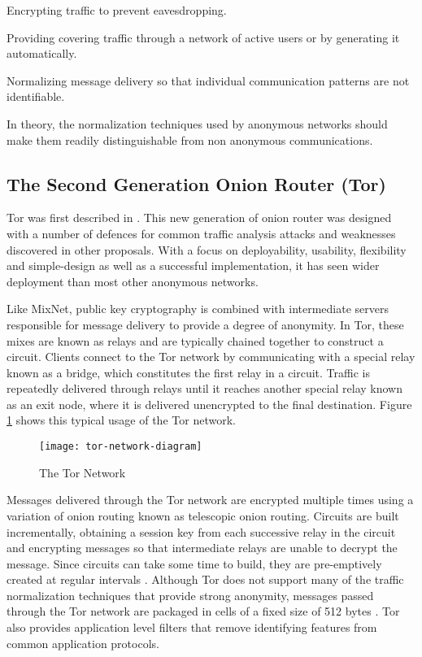 \documentclass{ecuthesis}
\begin{document}
\begin{itemize*}
  \item Encrypting traffic to prevent eavesdropping.
  \item Providing covering traffic through a network of active users or by
    generating it automatically.
  \item Normalizing message delivery so that individual communication patterns
    are not identifiable.
\end{itemize*}

In theory, the normalization techniques used by anonymous networks should make
them readily distinguishable from non anonymous communications.

\subsection{The Second Generation Onion Router (Tor)}

Tor was first described in 
\parencite{Dingledine:2004p314}. This new generation of onion router was
designed with a number of defences for common traffic analysis attacks and
weaknesses discovered in other proposals. With a focus on deployability,
usability, flexibility and simple-design \parencite[3-4]{Dingledine:2004p314}
as well as a successful implementation, it has seen wider deployment than most
other anonymous networks.

Like MixNet, public key cryptography is combined with intermediate servers
responsible for message delivery to provide a degree of anonymity. In Tor,
these mixes are known as relays and are typically chained together to
construct a circuit. Clients connect to the Tor network by communicating
with a special relay known as a bridge, which constitutes the first
relay in a circuit. Traffic is repeatedly delivered through relays until it
reaches another special relay known as an exit node, where it is
delivered unencrypted to the final destination. Figure \ref{tor-network} shows
this typical usage of the Tor network.

\begin{figure}[H]
  \centering\texttt{[image: tor-network-diagram]}
  \caption{The Tor Network}
  \label{tor-network}
\end{figure}

Messages delivered through the Tor network are encrypted multiple times using a
variation of onion routing \parencite{Michael:2001} known as telescopic onion
routing. Circuits are built incrementally, obtaining a session key from each
successive relay in the circuit and encrypting messages so that intermediate
relays are unable to decrypt the message. Since circuits can take some time to
build, they are pre-emptively created at regular intervals
\parencite[5]{Dingledine:2004p314}. Although Tor does not support many of the
traffic normalization techniques that provide strong anonymity, messages passed
through the Tor network are packaged in cells of a fixed size of 512 bytes
\parencite[5]{Dingledine:2004p314}. Tor also provides application level filters
that remove identifying features from common application protocols.
\end{document}
